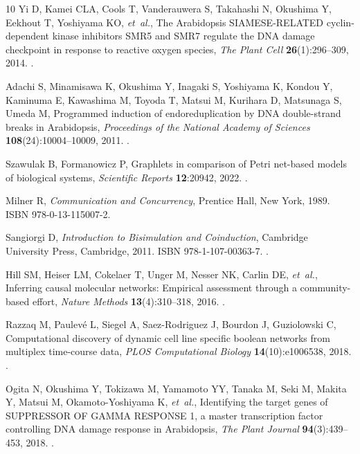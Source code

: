 \documentclass{ws-jbcb}
\numberwithin{equation}{section}
\begin{document}
\begin{thebibliography}{10}
Yi D, Kamei CLA, Cools T, Vanderauwera S, Takahashi N, Okushima Y, Eekhout T,
  Yoshiyama KO, \emph{et~al.}, The {Arabidopsis} {SIAMESE-RELATED}
  cyclin-dependent kinase inhibitors {SMR5} and {SMR7} regulate the {DNA}
  damage checkpoint in response to reactive oxygen species, \emph{The Plant
  Cell} \textbf{26}(1):296--309, 2014.
\newblock {}.

Adachi S, Minamisawa K, Okushima Y, Inagaki S, Yoshiyama K, Kondou Y, Kaminuma
  E, Kawashima M, Toyoda T, Matsui M, Kurihara D, Matsunaga S, Umeda M,
  Programmed induction of endoreduplication by {DNA} double-strand breaks in
  {Arabidopsis}, \emph{Proceedings of the National Academy of Sciences}
  \textbf{108}(24):10004--10009, 2011.
\newblock {}.

Szawulak B, Formanowicz P, Graphlets in comparison of {Petri} net-based models
  of biological systems, \emph{Scientific Reports} \textbf{12}:20942, 2022.
\newblock {}.

Milner R, \emph{Communication and Concurrency}, Prentice Hall, New York, 1989.
\newblock ISBN 978-0-13-115007-2.

Sangiorgi D, \emph{Introduction to Bisimulation and Coinduction}, Cambridge
  University Press, Cambridge, 2011.
\newblock ISBN 978-1-107-00363-7.
\newblock {}.

Hill SM, Heiser LM, Cokelaer T, Unger M, Nesser NK, Carlin DE, \emph{et~al.},
  Inferring causal molecular networks: Empirical assessment through a
  community-based effort, \emph{Nature Methods} \textbf{13}(4):310--318, 2016.
\newblock {}.

Razzaq M, Paulev{\'e} L, Siegel A, Saez-Rodriguez J, Bourdon J, Guziolowski C,
  Computational discovery of dynamic cell line specific boolean networks from
  multiplex time-course data, \emph{PLOS Computational Biology}
  \textbf{14}(10):e1006538, 2018.
\newblock {}.

Ogita N, Okushima Y, Tokizawa M, Yamamoto YY, Tanaka M, Seki M, Makita Y,
  Matsui M, Okamoto-Yoshiyama K, \emph{et~al.}, Identifying the target genes of
  {SUPPRESSOR OF GAMMA RESPONSE 1}, a master transcription factor controlling
  {DNA} damage response in {Arabidopsis}, \emph{The Plant Journal}
  \textbf{94}(3):439--453, 2018.
\newblock {}.


\end{thebibliography}
\end{document}
